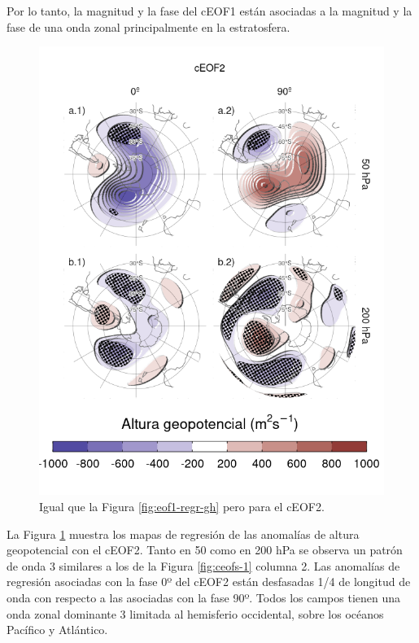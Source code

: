 \documentclass[12pt,oneside]{reedthesis}
\begin{document}
Por lo tanto, la magnitud y la fase del cEOF1 están asociadas a la magnitud y la fase de una onda zonal principalmente en la estratosfera.



\begin{figure}
\includegraphics{figures/20-ceofs/eof2-regr-gh-1} \caption{Igual que la Figura \ref{fig:eof1-regr-gh} pero para el cEOF2.}\label{fig:eof2-regr-gh}
\end{figure}

La Figura \ref{fig:eof2-regr-gh} muestra los mapas de regresión de las anomalías de altura geopotencial con el cEOF2.
Tanto en 50 como en 200 hPa se observa un patrón de onda 3 similares a los de la Figura \ref{fig:ceofs-1} columna 2.
Las anomalías de regresión asociadas con la fase 0º del cEOF2 están desfasadas 1/4 de longitud de onda con respecto a las asociadas con la fase 90º.
Todos los campos tienen una onda zonal dominante 3 limitada al hemisferio occidental, sobre los océanos Pacífico y Atlántico.
\end{document}
